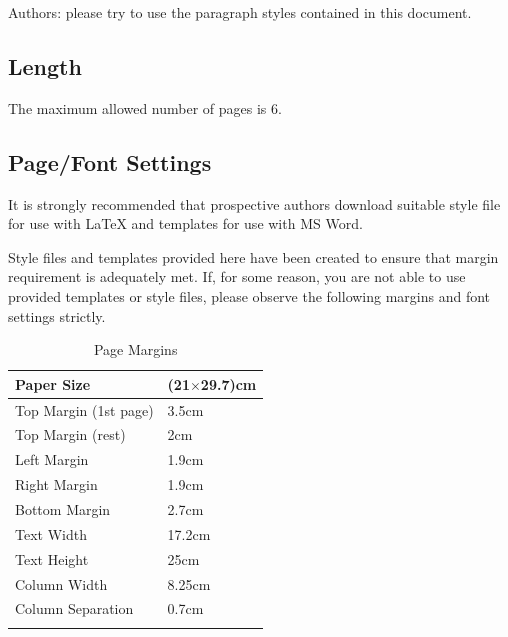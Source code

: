 \documentclass[english]{ccdconf}
\begin{document}
\LaTeXe{} Authors: please try to use the paragraph styles contained
in this document.

\subsection{Length}

The maximum allowed number of pages is 6.

\subsection{Page/Font Settings}

It is strongly recommended that prospective authors download
suitable style file for use with \LaTeX{} and templates for use with
MS Word.

Style files and templates provided here have been created to ensure
that margin requirement is adequately met. If, for some reason, you
are not able to use provided templates or style files, please
observe the following margins and font settings strictly.

\begin{table}
  \centering
  \caption{Page Margins}
  \label{tab1}
  \begin{tabular}{l|l}
    \hhline
    Paper Size          & (21$\times$29.7)cm \\ \hline
    Top Margin (1st page)   & 3.5cm \\ \hline
    Top Margin (rest)   & 2cm \\ \hline
    Left Margin         & 1.9cm \\ \hline
    Right Margin        & 1.9cm \\ \hline
    Bottom Margin       & 2.7cm \\ \hline
    Text Width          & 17.2cm \\ \hline
    Text Height         & 25cm \\ \hline
    Column Width        & 8.25cm \\ \hline
    Column Separation       & 0.7cm \\
    \hhline
  \end{tabular}
\end{table}
\end{document}

